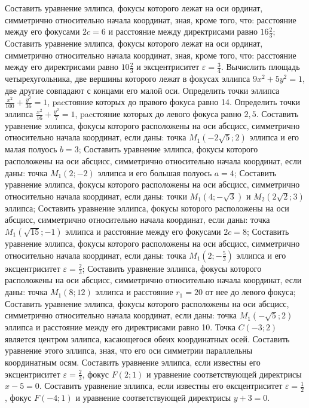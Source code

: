 Составить уравнение эллипса, фокусы которого лежат на оси ординат, симметрично относительно начала координат, зная, кроме того, что: расстояние между его фокусами $2 c=6$ и расстояние между директрисами равно $16 \frac{2}{3}$;
Составить уравнение эллипса, фокусы которого лежат на оси ординат, симметрично относительно начала координат, зная, кроме того, что: расстояние между его директрисами равно $10 \frac{2}{3}$ и эксцентриситет $\varepsilon=\frac{3}{4}$.
Вычислить площадь четырехугольника, две вершины которого лежат в фокусах эллипса $9 x^2+5 y^2=1$, две другие совпадают с концами его малой оси.
Определить точки эллипса $\frac{x^2}{100}+\frac{y^2}{36}=1$, pacстояние которых до правого фокуса равно 14.
Определить точки эллипса $\frac{x^2}{16}+\frac{y^2}{7}=1$, pacстояние которых до левого фокуса равно $2,5$.
Составить уравнение эллипса, фокусы которого расположены на оси абсцисс, симметрично относительно начала координат, если даны: точка $M_1(-2 \sqrt{5} ; 2)$ эллипса и его малая полуось $b=3$;
Составить уравнение эллипса, фокусы которого расположены на оси абсцисс, симметрично относительно начала координат, если даны: точка $M_1(2 ;-2)$ эллипса и его большая полуось $a=4$;
Составить уравнение эллипса, фокусы которого расположены на оси абсцисс, симметрично относительно начала координат, если даны: точки $M_1(4 ;-\sqrt{3})$ и $M_2(2 \sqrt{2} ; 3)$ эллипса;
Составить уравнение эллипса, фокусы которого расположены на оси абсцисс, симметрично относительно начала координат, если даны: точка $M_1(\sqrt{15} ;-1)$ эллипса и расстояние между его фокусами $2 c=8$;
Составить уравнение эллипса, фокусы которого расположены на оси абсцисс, симметрично относительно начала координат, если даны: точка $M_1\left(2 ;-\frac{5}{3}\right)$ эллипса и его эксцентриситет $\varepsilon=\frac{2}{3}$;
Составить уравнение эллипса, фокусы которого расположены на оси абсцисс, симметрично относительно начала координат, если даны: точка $M_1(8 ; 12)$ эллипса и расстояние $r_1=20$ от нее до левого фокуса;
Составить уравнение эллипса, фокусы которого расположены на оси абсцисс, симметрично относительно начала координат, если даны: точка $M_1(-\sqrt{5} ; 2)$ эллипса и расстояние между его директрисами равно 10.
Точка $C(-3 ; 2)$ является центром эллипса, касающегося обеих координатных осей. Составить уравнение этого эллипса, зная, что его оси симметрии параллельны координатным осям.
Составить уравнение эллипса, єсли известны его эксцентриситет $\varepsilon=\frac{2}{3}$, фокус $F(2 ; 1)$ и уравнение соответствующей директрисы $x-5=0$.
Составить уравнение эллипса, если известны его өксцентриситет $\varepsilon=\frac{1}{2}$, фокус $F(-4 ; 1)$ и уравнение соответствующей директрисы $y+3=0$.
